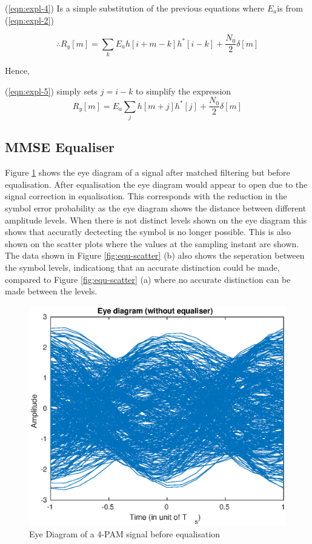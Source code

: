 (\ref{eqn:expl-4}) Is a simple substitution of the previous equations where $E_a$is from (\ref{eqn:expl-2})

\begin{equation}
    \label{eqn:expl-4}
    \therefore R_y[m] = \sum_k E_a h[i+m-k]h^*[i-k]+ \frac{N_0}{2}\delta [m]
\end{equation}

Hence,

(\ref{eqn:expl-5}) simply sets $j=i-k$ to simplify the expression
\begin{equation}
    \label{eqn:expl-5}
    R_y[m] = E_a \sum_j h[m+j]h^*[j] + \frac{N_0}{2} \delta [m]
\end{equation}

\subsection{MMSE Equaliser}

Figure \ref{fig:equ-eye} shows the eye diagram of a signal after matched filtering but before equalisation. After equalisation
the eye diagram would appear to open due to the signal correction in equalisation. This corresponds with the reduction in the
symbol error probability as the eye diagram shows the distance between different amplitude levels. When there is not distinct levels
shown on the eye diagram this shows that accuratly dectecting the symbol is no longer possible. This is also shown on the scatter plots 
where the values at the sampling instant are shown. The data shown in Figure \ref{fig:equ-scatter} (b) also shows the seperation
between the symbol levels, indicationg that an accurate distinction could be made, compared to Figure \ref{fig:equ-scatter} (a)
where no accurate distinction can be made between the levels.

\begin{figure}[H]
    \begin{center}
        \includegraphics{Equaliser/eye}
    \end{center}
    \caption{Eye Diagram of a 4-PAM signal before equalisation}
    \label{fig:equ-eye}
\end{figure}


